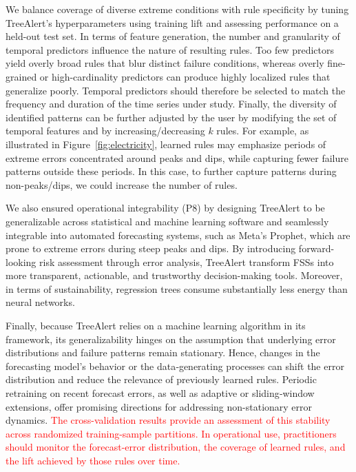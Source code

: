 \documentclass[12pt]{article}
\newcommand{\matt}[1]{\textcolor{red}{#1}}
\begin{document}
We balance coverage of diverse extreme conditions with rule specificity by tuning TreeAlert's hyperparameters using training lift and assessing performance on a held-out test set. In terms of feature generation, the number and granularity of temporal predictors influence the nature of resulting rules. Too few predictors yield overly broad rules that blur distinct failure conditions, whereas overly fine-grained or high-cardinality predictors can produce highly localized rules that generalize poorly. Temporal predictors should therefore be selected to match the frequency and duration of the time series under study. Finally, the diversity of identified patterns can be further adjusted by the user by modifying the set of temporal features and by increasing/decreasing $k$ rules. For example, as illustrated in Figure~\ref{fig:electricity}, learned rules may emphasize periods of extreme errors concentrated around peaks and dips, while capturing fewer failure patterns outside these periods. In this case, to further capture patterns during non-peaks/dips, we could increase the number of rules.

We also ensured operational integrability (P8) by designing TreeAlert to be generalizable across statistical and machine learning software and seamlessly integrable into automated forecasting systems, such as Meta's Prophet, which are prone to extreme errors during steep peaks and dips. By introducing forward-looking risk assessment through error analysis, TreeAlert transform FSSs into more transparent, actionable, and trustworthy decision-making tools. Moreover, in terms of sustainability, regression trees consume substantially less energy than neural networks.

Finally, because TreeAlert relies on a machine learning algorithm in its framework, its generalizability hinges on the assumption that underlying error distributions and failure patterns remain stationary. Hence, changes in the forecasting model's behavior or the data‑generating processes can shift the error distribution and reduce the relevance of previously learned rules. Periodic retraining on recent forecast errors, as well as adaptive or sliding‑window extensions, offer promising directions for addressing non-stationary error dynamics. \matt{The cross-validation results provide an assessment of this stability across randomized training-sample partitions. In operational use, practitioners should monitor the forecast-error distribution, the coverage of learned rules, and the lift achieved by those rules over time.}
\end{document}
